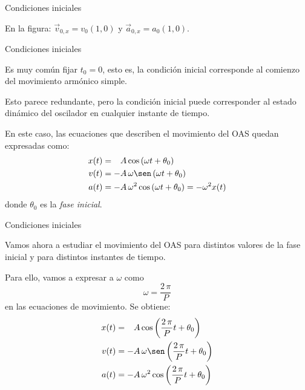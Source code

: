 \documentclass[11pt,handout,aspectratio=1610]{beamer}
\begin{document}
\begin{frame}{Condiciones iniciales}
    \vspace{11pt}
    
    En la figura: $\vec{v}_{0,x} = v_0 \left(1,0\right)$ y $\vec{a}_{0,x} = a_0 \left(1,0\right)$.

\end{frame}

\begin{frame}{Condiciones iniciales}

    Es muy común fijar $t_0 = 0$, esto es, la condición inicial corresponde al comienzo del movimiento armónico simple. 
    
    \vspace{11pt}

    Esto parece redundante, pero la condición inicial puede corresponder al estado dinámico del oscilador en cualquier instante de tiempo.

    \vspace{11pt}

    En este caso, las ecuaciones que describen el movimiento del OAS quedan expresadas como:
    \begin{align*}
        x (t) &= \phantom{+} A \cos \left(\omega t + \theta_0\right) \\
        v (t) &= - A \, \omega \sen \left(\omega t + \theta_0\right) \\
        a (t) &= - A \, \omega^2 \cos \left(\omega t + \theta_0\right) = - \omega^2 x(t) 
    \end{align*} donde $\theta_0$ es la \emph{fase inicial}.

\end{frame}

\begin{frame}{Condiciones iniciales}

    Vamos ahora a estudiar el movimiento del OAS para distintos valores de la fase inicial y para distintos instantes de tiempo.

    \vspace{11pt}

    Para ello, vamos a expresar a $\omega$ como $$\omega = \frac{2 \, \pi}{P}$$ en las ecuaciones de movimiento. Se obtiene:
    \begin{align*}
        x (t) &= \phantom{+} A \cos \left(\frac{2 \, \pi}{P} t + \theta_0\right) \\
        v (t) &= - A \, \omega \sen \left(\frac{2 \, \pi}{P} t + \theta_0\right) \\
        a (t) &= - A \, \omega^2 \cos \left(\frac{2 \, \pi}{P} t + \theta_0\right)
    \end{align*}
    
\end{frame}
\end{document}
